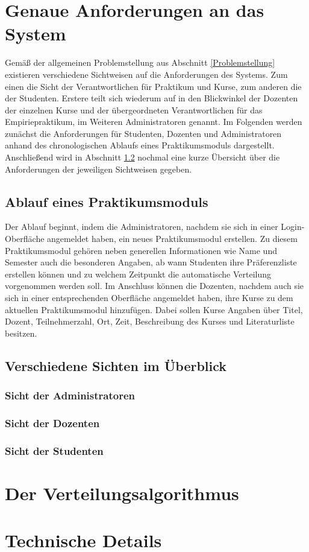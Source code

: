 \documentclass[12pt,a4paper]{article}
\begin{document}
    \section{Genaue Anforderungen an das System}
        Gemäß der allgemeinen Problemstellung aus Abschnitt \ref{Problemstellung} existieren verschiedene Sichtweisen auf die Anforderungen des Systems.
        Zum einen die Sicht der Verantwortlichen für Praktikum und Kurse, zum anderen die der Studenten.
        Erstere teilt sich wiederum auf in den Blickwinkel der Dozenten der einzelnen Kurse und der übergeordneten Verantwortlichen für das Empiriepraktikum, im Weiteren Administratoren genannt.
        Im Folgenden werden zunächst die Anforderungen für Studenten, Dozenten und Administratoren anhand des chronologischen Ablaufs eines Praktikumsmoduls dargestellt.
        Anschließend wird in Abschnitt \ref{Sichten} nochmal eine kurze Übersicht über die Anforderungen der jeweiligen Sichtweisen gegeben.
        
        \subsection{Ablauf eines Praktikumsmoduls}
            Der Ablauf beginnt, indem die Administratoren, nachdem sie sich in einer Login-Oberfläche angemeldet haben, ein neues Praktikumsmodul erstellen.
            Zu diesem Praktikumsmodul gehören neben generellen Informationen wie Name und Semester auch die besonderen Angaben, ab wann Studenten ihre Präferenzliste erstellen können und zu welchem Zeitpunkt die automatische Verteilung vorgenommen werden soll.
            Im Anschluss können die Dozenten, nachdem auch sie sich in einer entsprechenden Oberfläche angemeldet haben, ihre Kurse zu dem aktuellen Praktikumsmodul hinzufügen.
            Dabei sollen Kurse Angaben über Titel, Dozent, Teilnehmerzahl, Ort, Zeit, Beschreibung des Kurses und Literaturliste besitzen.
                    
        \subsection{Verschiedene Sichten im Überblick}
        \label{Sichten}
                    
            \subsubsection{Sicht der Administratoren}
                 
                
            \subsubsection{Sicht der Dozenten}

                
            \subsubsection{Sicht der Studenten}
            
    
    \section{Der Verteilungsalgorithmus}    
    
    \section{Technische Details}
    
    
\end{document}
